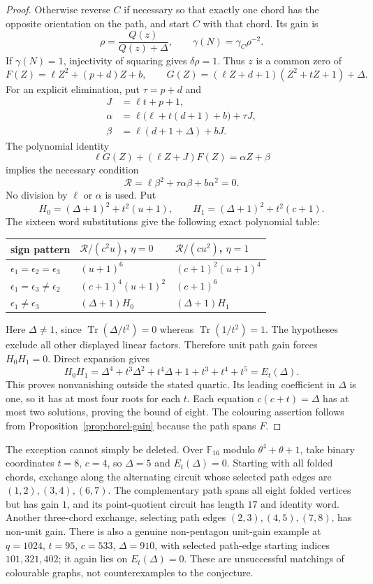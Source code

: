 \documentclass[11pt,a4paper]{article}
\theoremstyle{definition}
\theoremstyle{remark}
\begin{document}
\begin{proof}
Otherwise reverse $C$ if necessary so that exactly one chord has the opposite orientation on the path, and start $C$ with that chord.  Its gain is
\[
 \rho=\frac{Q(z)}{Q(z)+\Delta},\qquad
 \gamma(N)=\gamma_C\rho^{-2}.
\]
If $\gamma(N)=1$, injectivity of squaring gives $\delta\rho=1$.  Thus $z$ is a common zero of
\[
 F(Z)=\ell Z^2+(p+d)Z+b,\qquad
 G(Z)=(\ell Z+d+1)(Z^2+tZ+1)+\Delta.
\]
For an explicit elimination, put $\tau=p+d$ and
\[
 \begin{split}
 J&=\ell t+p+1,\\
 \alpha&=\ell\bigl(\ell+t(d+1)+b\bigr)+\tau J,\\
 \beta&=\ell(d+1+\Delta)+bJ.
 \end{split}
\]
The polynomial identity
\[
 \ell G(Z)+(\ell Z+J)F(Z)=\alpha Z+\beta
\]
implies the necessary condition
\[
 \mathcal R=\ell\beta^2+\tau\alpha\beta+b\alpha^2=0.
\]
No division by $\ell$ or $\alpha$ is used.  Put
\[
 H_0=(\Delta+1)^2+t^2(u+1),\qquad
 H_1=(\Delta+1)^2+t^2(c+1).
\]
The sixteen word substitutions give the following exact polynomial table:
\begin{center}
\begin{tabular}{lll}
\toprule
sign pattern & $\mathcal R/(c^2u)$, $\eta=0$ & $\mathcal R/(cu^2)$, $\eta=1$\\
\midrule
$\epsilon_1=\epsilon_2=\epsilon_3$ & $(u+1)^6$ & $(c+1)^2(u+1)^4$\\
$\epsilon_1=\epsilon_3\ne\epsilon_2$ & $(c+1)^4(u+1)^2$ & $(c+1)^6$\\
$\epsilon_1\ne\epsilon_3$ & $(\Delta+1)H_0$ & $(\Delta+1)H_1$\\
\bottomrule
\end{tabular}
\end{center}
Here $\Delta\ne1$, since $\operatorname{Tr}(\Delta/t^2)=0$ whereas $\operatorname{Tr}(1/t^2)=1$.  The hypotheses exclude all other displayed linear factors.  Therefore unit path gain forces $H_0H_1=0$.  Direct expansion gives
\[
 H_0H_1=\Delta^4+t^3\Delta^2+t^4\Delta+1+t^3+t^4+t^5=E_t(\Delta).
\]
This proves nonvanishing outside the stated quartic.  Its leading coefficient in $\Delta$ is one, so it has at most four roots for each $t$.  Each equation $c(c+t)=\Delta$ has at most two solutions, proving the bound of eight.  The colouring assertion follows from Proposition~\ref{prop:borel-gain} because the path spans $F$.
\end{proof}

The exception cannot simply be deleted.  Over $\mathbb F_{16}$ modulo $\theta^4+\theta+1$, take binary coordinates $t=8$, $c=4$, so $\Delta=5$ and $E_t(\Delta)=0$.  Starting with all folded chords, exchange along the alternating circuit whose selected path edges are $(1,2),(3,4),(6,7)$.  The complementary path spans all eight folded vertices but has gain $1$, and its point-quotient circuit has length $17$ and identity word.  Another three-chord exchange, selecting path edges $(2,3),(4,5),(7,8)$, has non-unit gain.  There is also a genuine non-pentagon unit-gain example at $q=1024$, $t=95$, $c=533$, $\Delta=910$, with selected path-edge starting indices $101,321,402$; it again lies on $E_t(\Delta)=0$.  These are unsuccessful matchings of colourable graphs, not counterexamples to the conjecture.
\end{document}
